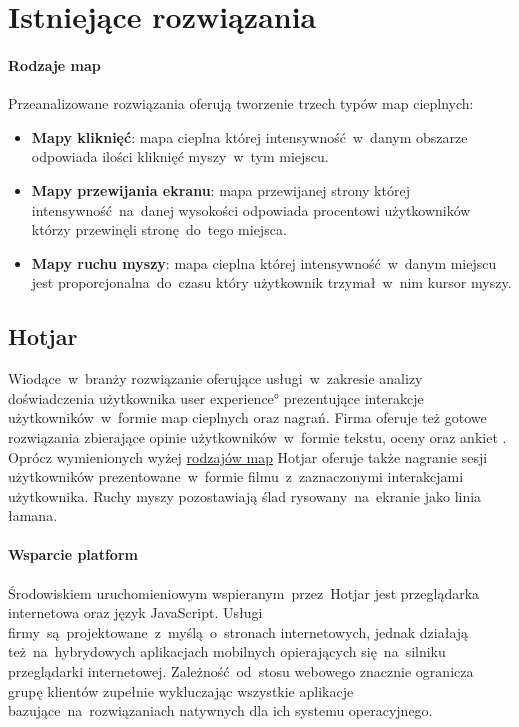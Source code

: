 \section{Istniejące rozwiązania}

\paragraph{Rodzaje map}
\label{par:heat_map_types}
Przeanalizowane rozwiązania oferują tworzenie trzech typów map cieplnych:

\begin{itemize}
	\item {\bf Mapy kliknięć}: mapa cieplna której intensywność~w~danym obszarze odpowiada ilości kliknięć myszy~w~tym miejscu.
	\item {\bf Mapy przewijania ekranu}: mapa przewijanej strony której intensywność~na~danej wysokości odpowiada procentowi użytkowników którzy przewinęli stronę~do~tego miejsca.
	\item {\bf Mapy ruchu myszy}: mapa cieplna której intensywność~w~danym miejscu jest proporcjonalna~do~czasu który użytkownik trzymał~w~nim kursor myszy.
\end{itemize}

\subsection{Hotjar}
Wiodące~w~branży rozwiązanie oferujące usługi~w~zakresie analizy doświadczenia użytkownika \ang{user experience} prezentujące interakcje użytkowników~w~formie map cieplnych oraz nagrań. Firma oferuje też gotowe rozwiązania zbierające opinie użytkowników~w~formie tekstu, oceny oraz ankiet \cite{Hotjar_website}. Oprócz wymienionych wyżej \hyperref[{par:heat_map_types}]{rodzajów map} Hotjar oferuje także nagranie sesji użytkowników prezentowane~w~formie filmu~z~zaznaczonymi interakcjami użytkownika. Ruchy myszy pozostawiają ślad rysowany~na~ekranie jako linia łamana.

\paragraph{Wsparcie platform} 
Środowiskiem uruchomieniowym wspieranym~przez~Hotjar jest przeglądarka internetowa oraz język JavaScript. Usługi firmy~są~projektowane~z~myślą~o~stronach internetowych, jednak działają też~na~hybrydowych aplikacjach mobilnych opierających się~na~silniku przeglądarki internetowej. Zależność~od~stosu webowego znacznie ogranicza grupę klientów zupełnie wykluczając wszystkie aplikacje bazujące~na~rozwiązaniach natywnych dla ich systemu operacyjnego.


